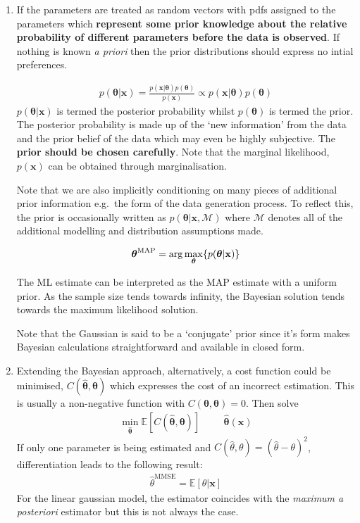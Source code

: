 \documentclass[a4paper]{article}
\newcommand{\ix}[1]{%
  \leavevmode %
  \marginpar{\small\emph{#1}}%
}
\newcommand{\expt}[1]{%
  \mathbb{E}[#1]
}
\newcommand{\vect}[1]{\boldsymbol{\mathbf{#1}}}
\DeclarePairedDelimiter{\mybrace}{\lbrace}{\rbrace}
\begin{document}
\begin{enumerate}
\item\ix{Bayesian Method}If the parameters are treated as random vectors with pdfs assigned to the parameters which \textbf{represent some prior knowledge about the relative probability of different parameters before the data is observed}. If nothing is known \emph{a priori} then the prior distributions should express no intial preferences. 

\begin{align*}
  p(\vect{\theta}|\vect{x}) = \frac{p(\vect{x}|\vect{\theta})p(\vect{\theta})}{p(\vect{x})} \propto p(\vect{x}|\vect{\theta})p(\vect{\theta})
\end{align*}
\(p(\vect{\theta}|\vect{x})\) is termed the posterior probability whilst \(p(\vect{\theta})\) is termed the prior. The posterior probability is made up of the `new information' from the data and the prior belief of the data which may even be highly subjective. The \textbf{prior should be chosen carefully}. Note that the marginal likelihood, \(p(\vect{x})\) can be obtained through marginalisation. 

Note that we are also implicitly conditioning on many pieces of additional prior information e.g.\ the form of the data generation process. To reflect this, the prior is occasionally written as \(p(\vect{\theta}|\vect{x}, \mathcal{M})\) where \(\mathcal{M}\) denotes all of the additional modelling and distribution assumptions made. 

\begin{align*}
  \vect{\theta}^{\text{MAP}} = \arg \max_{\vect{\theta}} \mybrace{ p(\vect{\theta}|\vect{x})}
\end{align*}

The ML estimate can be interpreted as the MAP estimate with a uniform prior. As the sample size tends towards infinity, the Bayesian solution tends towards the maximum likelihood solution.

Note that the Gaussian is said to be a `conjugate' prior since it's form makes Bayesian calculations straightforward and available in closed form. 


\item\ix{MMSE}Extending the Bayesian approach, alternatively, a cost function could be minimised, \(C(\vect{\hat{\theta}}, \vect{\theta})\) which expresses the cost of an incorrect estimation. This is usually a non-negative function with \(C(\vect{\theta}, \vect{\theta})=0\). Then solve
\begin{align*}
  \min_{\vect{\hat{\theta}}} \expt{C(\vect{\hat{\theta}}, \vect{\theta})} \hspace{1cm} \hat{\vect{\theta}}\vect{(x)}
\end{align*}
If only one parameter is being estimated and \(C(\hat{\theta}, \theta)=(\hat{\theta}-\theta)^2\), differentiation leads to the following result:
\begin{align*}
  \hat{\theta}^{\text{MMSE}} = \expt{\theta|\vect{x}}
\end{align*}
For the linear gaussian model, the estimator coincides with the \emph{maximum a posteriori} estimator but this is not always the case. 

\end{enumerate}
\end{document}
